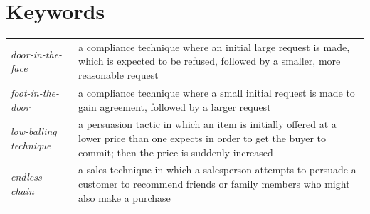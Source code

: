 \section*{Keywords}
\begin{tabularx}{\textwidth}{ l X }
    \textit{door-in-the-face} & a compliance technique where an initial large request is made, which is expected to be refused, followed by a smaller, more reasonable request \\
    \textit{foot-in-the-door} & a compliance technique where a small initial request is made to gain agreement, followed by a larger request \\
    \textit{low-balling technique} & a persuasion tactic in which an item is initially offered at a lower price than one expects in order to get the buyer to commit; then the price is suddenly increased \\ 
    \textit{endless-chain} & a sales technique in which a salesperson attempts to persuade a customer to recommend friends or family members who might also make a purchase \\
\end{tabularx}
